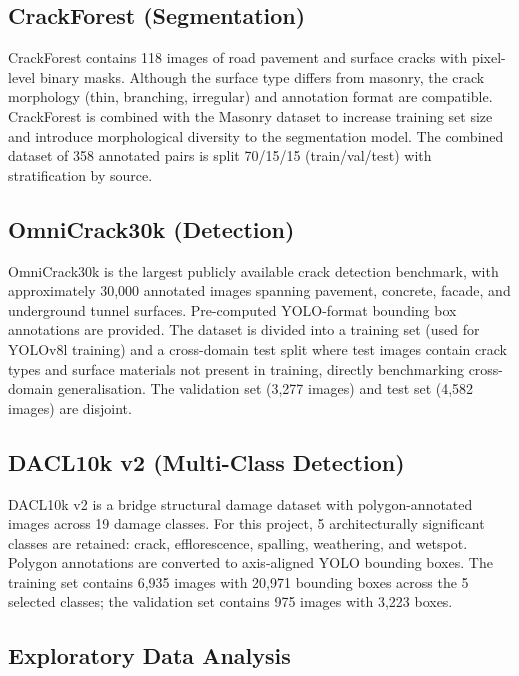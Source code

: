 \documentclass[12pt,a4paper]{article}
\begin{document}
\subsection{CrackForest (Segmentation)}

CrackForest contains 118 images of road pavement and surface cracks with pixel-level binary masks. Although the surface type differs from masonry, the crack morphology (thin, branching, irregular) and annotation format are compatible. CrackForest is combined with the Masonry dataset to increase training set size and introduce morphological diversity to the segmentation model. The combined dataset of 358 annotated pairs is split 70/15/15 (train/val/test) with stratification by source.

\subsection{OmniCrack30k (Detection)}

OmniCrack30k is the largest publicly available crack detection benchmark, with approximately 30,000 annotated images spanning pavement, concrete, facade, and underground tunnel surfaces. Pre-computed YOLO-format bounding box annotations are provided. The dataset is divided into a training set (used for YOLOv8l training) and a cross-domain test split where test images contain crack types and surface materials not present in training, directly benchmarking cross-domain generalisation. The validation set (3,277 images) and test set (4,582 images) are disjoint.

\subsection{DACL10k v2 (Multi-Class Detection)}

DACL10k v2 is a bridge structural damage dataset with polygon-annotated images across 19 damage classes. For this project, 5 architecturally significant classes are retained: crack, efflorescence, spalling, weathering, and wetspot. Polygon annotations are converted to axis-aligned YOLO bounding boxes. The training set contains 6,935 images with 20,971 bounding boxes across the 5 selected classes; the validation set contains 975 images with 3,223 boxes.

\subsection{Exploratory Data Analysis}
\label{subsec:eda}
\end{document}
